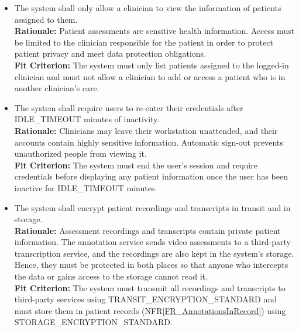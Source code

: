 \documentclass[12pt]{article}
\newcounter{nfrnum} %
\newcommand{\rthenfrnum}{NFR\thenfrnum}
\newcommand{\nfrref}[1]{NFR\ref{#1}}
\begin{document}
\noindent \begin{itemize}

\item[\textbf{\rthenfrnum}:]
\label{NFR-S1}
  The system shall only allow a clinician to view the information of patients assigned to them.
  \\ \textbf{Rationale:} Patient assessments are sensitive health information. Access must be limited to the clinician responsible for the patient in order to protect patient privacy and meet data protection obligations.
  \\ \textbf{Fit Criterion:} The system must only list patients assigned to the logged-in clinician and must not allow a clinician to add or access a patient who is in another clinician’s care.

\item[\textbf{\rthenfrnum}:]
\label{NFR-S2}
  The system shall require users to re-enter their credentials after IDLE\_TIMEOUT minutes of inactivity.
  \\ \textbf{Rationale:} Clinicians may leave their workstation unattended, and their accounts contain highly sensitive information. Automatic sign-out prevents unauthorized people from viewing it.
  \\ \textbf{Fit Criterion:} The system must end the user’s session and require credentials before displaying any patient information once the user has been inactive for IDLE\_TIMEOUT minutes.

\item[\textbf{\rthenfrnum}:]
\label{NFR-S3}
  The system shall encrypt patient recordings and transcripts in transit and in storage.
  \\ \textbf{Rationale:} Assessment recordings and transcripts contain private patient information. The annotation service sends video assessments to a third-party transcription service, and the recordings are also kept in the system’s storage. Hence, they must be protected in both places so that anyone who intercepts the data or gains access to the storage cannot read it.
  \\ \textbf{Fit Criterion:} The system must transmit all recordings and transcripts to third-party services using TRANSIT\_ENCRYPTION\_STANDARD and must store them in patient records (\nfrref{FR_AnnotationsInRecord}) using STORAGE\_ENCRYPTION\_STANDARD.


\end{itemize}
\end{document}
